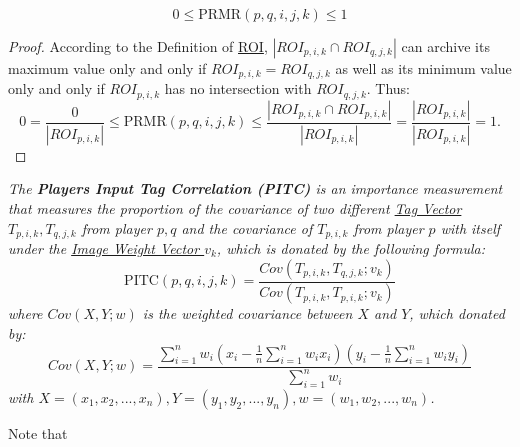 \begin{lemma}
\label{lemma:prmrrange}
\begin{equation}
\label{eq:prmrrange}
0 \leq \text{PRMR}(p, q, i, j, k) \leq 1
\end{equation}
\end{lemma}
\begin{proof}
According to the Definition of \hyperref[def:roi]{ROI}, $| ROI_{p,i,k} \cap ROI_{q,j,k} |$ 
can archive its maximum value only and only if $ROI_{p,i,k} =  ROI_{q,j,k}$ 
as well as its minimum value only and only if $ROI_{p,i,k}$ has no intersection with $ROI_{q,j,k}$.
Thus:
\[
0 = \frac{0}{|ROI_{p,i,k}|} \leq \text{PRMR}(p, q, i, j, k) \leq
\frac{| ROI_{p,i,k} \cap ROI_{p,i,k} | }{|ROI_{p,i,k}|} = \frac{|ROI_{p,i,k}|}{|ROI_{p,i,k}|} = 1.
\]
\end{proof}

\begin{definition}
\label{def:pitc}
\emph{
The \textbf{Players Input Tag Correlation (PITC)} is an importance measurement that measures the proportion of
the covariance of two different \hyperref[def:tagv]{Tag Vector $T_{p,i,k}, T_{q,j,k}$} from player $p, q$ and the covariance of $T_{p,i,k}$ from player $p$ with itself under the
\hyperref[def:weightvk]{Image Weight Vector $v_k$}, which is donated by the following formula:
\begin{equation}
\text{PITC}(p, q, i, j, k) = \frac{Cov(T_{p,i,k}, T_{q,j,k}; v_k)}{Cov(T_{p,i,k}, T_{p,i,k}; v_k)}
\end{equation}
where $Cov(X, Y; w)$ is the weighted covariance between $X$ and $Y$, which donated by:
\begin{equation}
\label{eq:cov}
Cov(X, Y; w) = \frac{\sum_{i=1}^{n}{w_i(x_i-\frac{1}{n}\sum_{i=1}^{n}{w_i x_i})(y_i-\frac{1}{n}\sum_{i=1}^{n}{w_i y_i})}}{\sum_{i=1}^{n}{w_i}}
\end{equation}
with $X = (x_1, x_2, ..., x_n), Y = (y_1, y_2, ..., y_n), w = (w_1, w_2, ..., w_n)$.
}
\end{definition}

Note that

